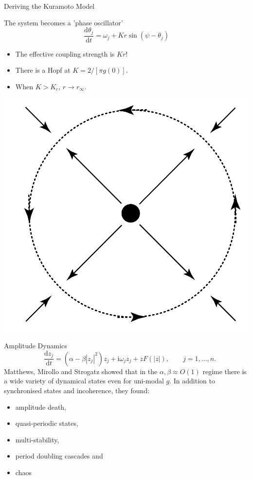 \documentclass[10pt,reqno]{beamer}
\newcommand{\D}[2]{\frac{\mathrm{d} #1}{\mathrm{d} #2}}
\newcommand{\I}{\mathrm{i}}
\begin{document}
\begin{frame}{Deriving the Kuramoto Model}
{\begin{minipage}{0.7\linewidth}
The system becomes a 'phase oscillator'
\[
\D{\theta_j}{t} = \omega_j + Kr\sin(\psi - \theta_j)
\]
\begin{itemize}
\item The effective coupling strength is $Kr$!
\item There is a Hopf at $K = 2/[\pi g(0)]$.
\item When $K>K_c$, $r \rightarrow r_\infty$.
\end{itemize}
\end{minipage}\hfill
\begin{minipage}{0.3\linewidth}
\includegraphics[height=0.3\textheight]{hopffast}
\end{minipage}


}
\end{frame}
\begin{frame}{Amplitude Dynamics}
\[
\quad \D{z_j}{t} = (\alpha - \beta|z_j|^2)z_j + \I\omega_jz_j +zF(|z|), \qquad j = 1,\ldots, n.
\]
Matthews, Mirollo and Strogatz\cite{Matthews91} showed that in the $\alpha, \beta \approx O(1)$ regime there is a wide variety of dynamical states even for uni-modal $g$.
In addition to synchronised states and incoherence, they found:
\begin{itemize}
\item amplitude death,
\item quasi-periodic states,
\item multi-stability,
\item period doubling cascades and
\item chaos
\end{itemize}
\end{frame}
\end{document}
